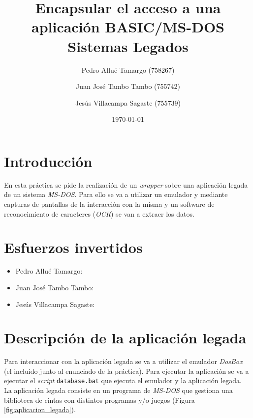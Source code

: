 \documentclass[10pt,a4paper]{article}
\begin{document}
\begin{titlepage}
\title{\textbf{
	{\Huge Encapsular el acceso a una aplicación BASIC/MS-DOS}\\
	{\Large Sistemas Legados}
}}
\author{
	Pedro Allué Tamargo (758267)
	\and
	Juan José Tambo Tambo (755742)
	\and
	Jesús Villacampa Sagaste (755739)
}
\date{\today}
\clearpage\maketitle
\thispagestyle{empty}
\tableofcontents
\end{titlepage}


\section{Introducción}

En esta práctica se pide la realización de un \emph{wrapper} sobre una aplicación legada de un sistema \emph{MS-DOS}. Para ello se va a utilizar un emulador y mediante capturas de pantallas de la interacción con la misma y un software de reconocimiento de caracteres (\emph{OCR}) se van a extraer los datos.


\section{Esfuerzos invertidos}

\begin{itemize}
\item Pedro Allué Tamargo:
\item Juan José Tambo Tambo:
\item Jesús Villacampa Sagaste:
\end{itemize}

\section{Descripción de la aplicación legada}

Para interaccionar con la aplicación legada se va a utilizar el emulador \emph{DosBox} (el incluido junto al enunciado de la práctica). Para ejecutar la aplicación se va a ejecutar el \emph{script} \texttt{database.bat} que ejecuta el emulador y la aplicación legada.\\
La aplicación legada consiste en un programa de \emph{MS-DOS} que gestiona una biblioteca de cintas con distintos programas y/o juegos (Figura \ref{fig:aplicacion_legada}).
\end{document}
